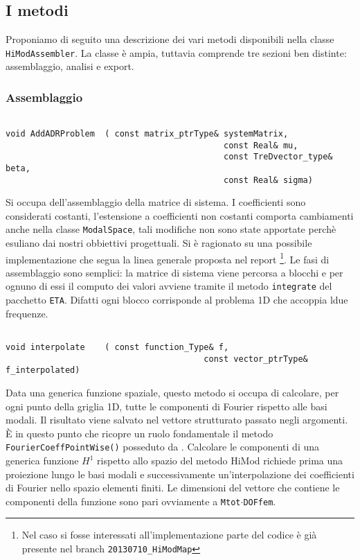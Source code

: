 \subsection{I metodi}
Proponiamo di seguito una descrizione dei vari metodi disponibili nella classe \texttt{HiModAssembler}. La classe \`e ampia, tuttavia comprende 
tre sezioni ben distinte: assemblaggio, analisi e export.
\subsubsection{Assemblaggio}
\begin{lstlisting}[style=general,frame=none]

void AddADRProblem	( const matrix_ptrType& systemMatrix,
											const Real& mu, 
											const TreDvector_type& beta, 
											const Real& sigma)
\end{lstlisting}
Si occupa dell'assemblaggio della matrice di sistema. I coefficienti sono considerati costanti, l'estensione 
a coefficienti non costanti comporta cambiamenti anche nella classe \texttt{ModalSpace}, tali modifiche non sono state apportate perch\`e esuliano
dai nostri obbiettivi progettuali. Si \`e ragionato su una possibile implementazione che segua la linea generale proposta nel report \citep{perotto:2008} \footnote{Nel caso si fosse interessati all'implementazione parte del codice \`e gi\`a presente nel branch \texttt{20130710\_HiModMap}}.
Le fasi di assemblaggio sono semplici: la matrice di sistema viene percorsa a blocchi e per ognuno di essi il computo dei valori avviene tramite 
il metodo \texttt{integrate} del pacchetto \texttt{ETA}. Difatti ogni blocco corrisponde al problema 1D che accoppia ldue frequenze.

\begin{lstlisting}[style = general, frame = none]

void interpolate	( const function_Type& f,
										const vector_ptrType& f_interpolated)
\end{lstlisting}
Data una generica funzione spaziale, questo metodo si occupa di calcolare, per ogni punto della griglia 1D, tutte le componenti di Fourier 
rispetto alle basi modali. Il risultato viene salvato nel vettore strutturato passato negli argomenti. \`E in questo punto che ricopre un ruolo 
fondamentale il metodo \texttt{FourierCoeffPointWise()} posseduto da .
Calcolare le componenti di una generica funzione $H^1$ rispetto allo spazio del metodo HiMod  richiede prima una proiezione lungo le basi modali e successivamente un'interpolazione dei coefficienti di Fourier nello spazio elementi finiti. Le dimensioni del vettore che contiene le componenti della funzione sono pari ovviamente a \texttt{Mtot$\cdot$DOFfem}.

